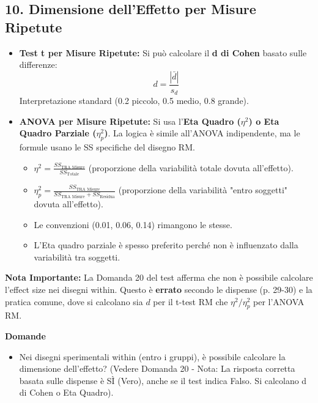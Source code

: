 \documentclass[12pt, a4paper]{article}
\newenvironment{reflectionbox}{%
    \medskip
    \begin{framed}\par\noindent
    \textbf{\color{boxtitlecolor}Domande} \par
    \begin{itemize}[leftmargin=*, label=$\blacktriangleright$]
}{%
    \end{itemize}\par
    \end{framed}
    \medskip
}
\newcommand{\etasq}{\eta^2} %
\newcommand{\etasqpart}{\eta_p^2} %
\begin{document}
\subsection*{10. Dimensione dell'Effetto per Misure Ripetute}
\begin{itemize}
    \item \textbf{Test t per Misure Ripetute:} Si può calcolare il \textbf{d di Cohen} basato sulle differenze:
      $$ d = \frac{|\bar{d}|}{s_d} $$
      Interpretazione standard (0.2 piccolo, 0.5 medio, 0.8 grande).
    \item \textbf{ANOVA per Misure Ripetute:} Si usa l'\textbf{Eta Quadro ($\etasq$) o Eta Quadro Parziale ($\etasqpart$)}. La logica è simile all'ANOVA indipendente, ma le formule usano le SS specifiche del disegno RM.
        \begin{itemize}
            \item $\etasq = \frac{SS_{\text{TRA Misure}}}{SS_{\text{Totale}}}$ (proporzione della variabilità totale dovuta all'effetto).
            \item $\etasqpart = \frac{SS_{\text{TRA Misure}}}{SS_{\text{TRA Misure}} + SS_{\text{Residua}}}$ (proporzione della variabilità "entro soggetti" dovuta all'effetto).
            \item Le convenzioni (0.01, 0.06, 0.14) rimangono le stesse.
            \item L'Eta quadro parziale è spesso preferito perché non è influenzato dalla variabilità tra soggetti.
        \end{itemize}
\end{itemize}
\textbf{Nota Importante:} La Domanda 20 del test afferma che non è possibile calcolare l'effect size nei disegni within. Questo è \textbf{errato} secondo le dispense (p. 29-30) e la pratica comune, dove si calcolano sia $d$ per il t-test RM che $\etasq / \etasqpart$ per l'ANOVA RM.

\begin{reflectionbox}
    \item Nei disegni sperimentali within (entro i gruppi), è possibile calcolare la dimensione dell'effetto? (Vedere Domanda 20 - Nota: La risposta corretta basata sulle dispense è SÌ (Vero), anche se il test indica Falso. Si calcolano d di Cohen o Eta Quadro).
\end{reflectionbox}
\end{document}
